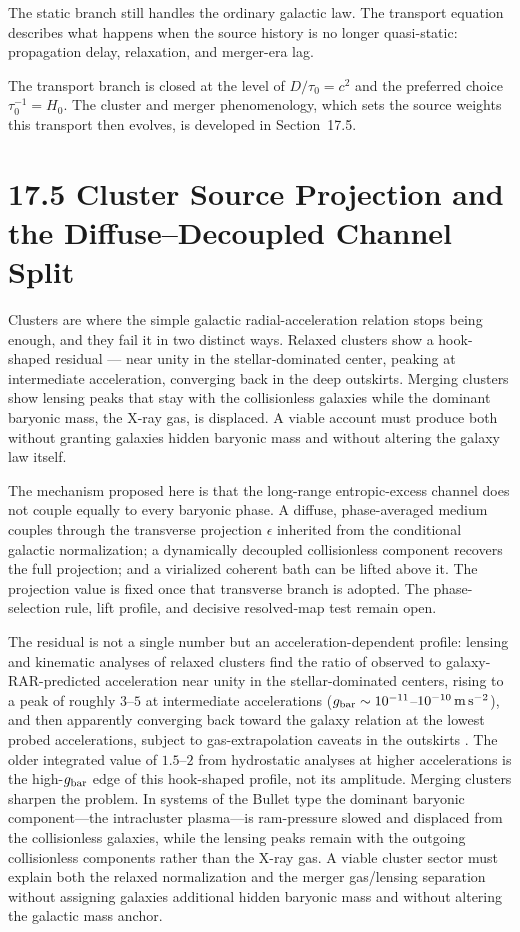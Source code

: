 \documentclass[11pt]{article}
\begin{document}
The static branch still handles the ordinary galactic law. The transport equation describes what happens when the source history is no longer quasi-static: propagation delay, relaxation, and merger-era lag.

The transport branch is closed at the level of $D/\tau_0=c^2$ and the preferred choice $\tau_0^{-1}=H_0$. The cluster and merger phenomenology, which sets the source weights this transport then evolves, is developed in Section~17.5.

\section{17.5 Cluster Source Projection and the Diffuse--Decoupled Channel Split}

Clusters are where the simple galactic radial-acceleration relation stops being enough, and they fail it in two distinct ways. Relaxed clusters show a hook-shaped residual --- near unity in the stellar-dominated center, peaking at intermediate acceleration, converging back in the deep outskirts. Merging clusters show lensing peaks that stay with the collisionless galaxies while the dominant baryonic mass, the X-ray gas, is displaced. A viable account must produce both without granting galaxies hidden baryonic mass and without altering the galaxy law itself.

The mechanism proposed here is that the long-range entropic-excess channel does not couple equally to every baryonic phase. A diffuse, phase-averaged medium couples through the transverse projection $\epsilon$ inherited from the conditional galactic normalization; a dynamically decoupled collisionless component recovers the full projection; and a virialized coherent bath can be lifted above it. The projection value is fixed once that transverse branch is adopted. The phase-selection rule, lift profile, and decisive resolved-map test remain open.

The residual is not a single number but an acceleration-dependent profile: lensing and kinematic analyses of relaxed clusters \citep{Tian2020,Eckert2022,Li2023} find the ratio of observed to galaxy-RAR-predicted acceleration near unity in the stellar-dominated centers, rising to a peak of roughly $3$--$5$ at intermediate accelerations ($g_{\rm bar}\sim10^{-11}$--$10^{-10}\,{\rm m\,s^{-2}}$), and then apparently converging back toward the galaxy relation at the lowest probed accelerations, subject to gas-extrapolation caveats in the outskirts \citep{Li2023}. The older integrated value of $1.5$--$2$ from hydrostatic analyses at higher accelerations is the high-$g_{\rm bar}$ edge of this hook-shaped profile, not its amplitude. Merging clusters sharpen the problem. In systems of the Bullet type the dominant baryonic component---the intracluster plasma---is ram-pressure slowed and displaced from the collisionless galaxies, while the lensing peaks remain with the outgoing collisionless components rather than the X-ray gas. A viable cluster sector must explain both the relaxed normalization and the merger gas/lensing separation without assigning galaxies additional hidden baryonic mass and without altering the galactic mass anchor.
\end{document}
